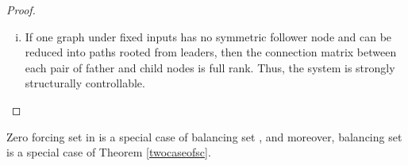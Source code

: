 \documentclass[a4paper,11pt]{article}
\begin{document}
{\begin{proof}
\begin{enumerate}[i)]
Without loss of generality, we set input matrix $B=\left[ {\begin{array}{*{20}{c}} B_1^T&B_2^T&\cdots&B_m^T\end{array}} \right]^T\in\mathbb{R}^{n\times n_1},$ with $B_1=I_{n_1}$, $B_i=0$, $i=2,\ldots,m.$ If $rank(L_{21})=rank(\bar L_{21})=n_2$, $rank(L_{32})=rank(\bar L_{32})=n_3$, $\cdots,$ $rank(L_{m\cdot{m-1}})=rank(\bar L_{m\cdot{m-1}})=n_m$, and there is not any symmetric follower node, then the rows of $L$ and $L^*$ associated with nodes $n_2$, $\ldots$, $n_m$ are linearly independent whatever the forms of $L_i$, $\bar L_i$ are. Consequently, $[L-\lambda I|B]$ and $[L^*-\lambda I|B]$ are both full row rank for any choice of weights, otherwise there exist symmetric follower nodes in the corresponding topology.
  \item If one graph under fixed inputs has no symmetric follower node and can be reduced into paths rooted from leaders, then the connection matrix between each pair of father and child nodes is full rank. Thus, the system is strongly structurally controllable.
\end{enumerate}
\end{proof}
{\begin{remark}
Zero forcing set in \cite{zeroforce1} is a special case of balancing set \cite{zeroforce2}, and moreover, balancing set is a special case of Theorem \ref{twocaseofsc}.
\end{remark}}

}
\end{document}
